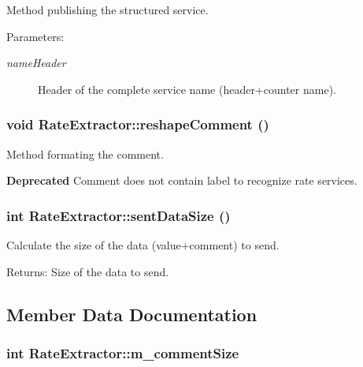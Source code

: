 Method publishing the structured service.

\begin{Desc}
\item[Parameters:]
\begin{description}
\item[{\em name\-Header}]Header of the complete service name (header+counter name). \end{description}
\end{Desc}
\subsubsection{\setlength{\rightskip}{0pt plus 5cm}void Rate\-Extractor::reshape\-Comment ()\hspace{0.3cm}{\tt  [private]}}\label{classRateExtractor_d1}


Method formating the comment. 

\begin{Desc}
\item[{\bf Deprecated}]Comment does not contain label to recognize rate services. \end{Desc}
\subsubsection{\setlength{\rightskip}{0pt plus 5cm}int Rate\-Extractor::sent\-Data\-Size ()\hspace{0.3cm}{\tt  [private]}}\label{classRateExtractor_d2}


Calculate the size of the data (value+comment) to send.

\begin{Desc}
\item[Returns:]Size of the data to send. \end{Desc}


\subsection{Member Data Documentation}
\subsubsection{\setlength{\rightskip}{0pt plus 5cm}int {\bf Rate\-Extractor::m\_\-comment\-Size}\hspace{0.3cm}{\tt  [private]}}\label{classRateExtractor_r4}


